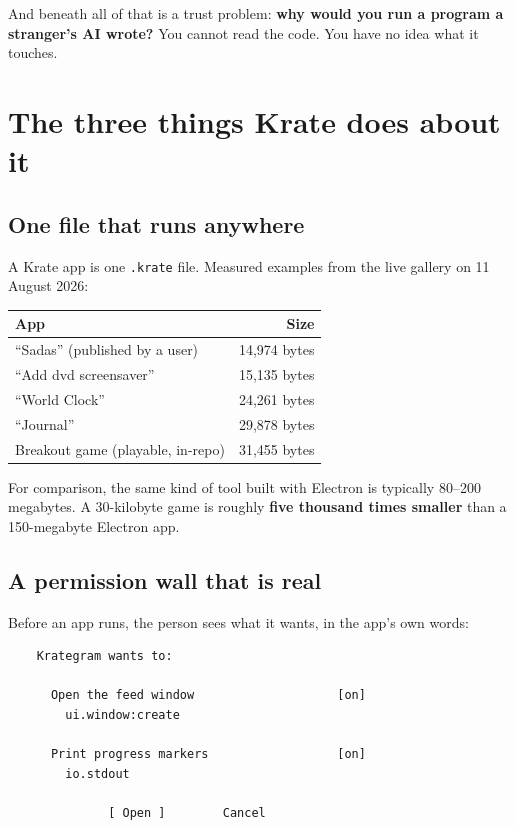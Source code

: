 \documentclass[11pt,a4paper]{report}
\begin{document}
And beneath all of that is a trust problem: \textbf{why would you run a
program a stranger's AI wrote?} You cannot read the code. You have no idea
what it touches.

\section{The three things Krate does about it}

\subsection{One file that runs anywhere}

A Krate app is one \texttt{.krate} file. Measured examples from the live
gallery on 11 August 2026:

\begin{center}
\begin{tabular}{lr}
\toprule
\textbf{App} & \textbf{Size} \\
\midrule
``Sadas'' (published by a user) & 14{,}974 bytes \\
``Add dvd screensaver'' & 15{,}135 bytes \\
``World Clock'' & 24{,}261 bytes \\
``Journal'' & 29{,}878 bytes \\
Breakout game (playable, in-repo) & 31{,}455 bytes \\
\bottomrule
\end{tabular}
\end{center}

For comparison, the same kind of tool built with Electron is typically
80--200 megabytes. A 30-kilobyte game is roughly \textbf{five thousand
times smaller} than a 150-megabyte Electron app.

\subsection{A permission wall that is real}

Before an app runs, the person sees what it wants, in the app's own words:

\begin{verbatim}
    Krategram wants to:

      Open the feed window                    [on]
        ui.window:create

      Print progress markers                  [on]
        io.stdout

              [ Open ]        Cancel
\end{verbatim}
\end{document}
